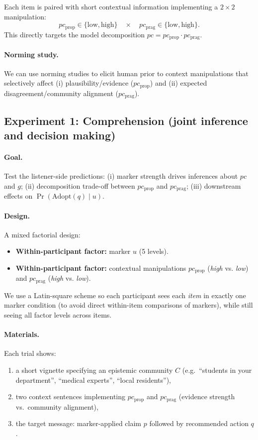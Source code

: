 \documentclass[12pt]{article}
\begin{document}
\noindent Each item is paired with short contextual information implementing a $2 \times 2$ manipulation:
\[
pc_{\text{prop}} \in \{\text{low},\text{high}\}
\quad\times\quad
pc_{\text{prag}} \in \{\text{low},\text{high}\}.
\]
This directly targets the model decomposition $pc = pc_{\text{prop}}\cdot pc_{\text{prag}}$.

\paragraph{Norming study.}
We can use norming studies to elicit human prior to context manipulations that selectively affect (i) plausibility/evidence ($pc_{\text{prop}}$) and (ii) expected disagreement/community alignment ($pc_{\text{prag}}$).

\subsection{Experiment 1: Comprehension (joint inference and decision making)}

\paragraph{Goal.}
Test the listener-side predictions:
(i) marker strength drives inferences about $pc$ and $g$;
(ii) decomposition trade-off between $pc_{\text{prop}}$ and $pc_{\text{prag}}$;
(iii) downstream effects on $\Pr(\mathrm{Adopt}(q)\mid u)$.

\paragraph{Design.}
A mixed factorial design:
\begin{itemize}
\item \textbf{Within-participant factor:} marker $u$ (5 levels).
\item \textbf{Within-participant factor:} contextual manipulations $pc_{\text{prop}}$ (\textit{high} vs. \textit{low}) and $pc_{\text{prag}}$ (\textit{high} vs. \textit{low}).
\end{itemize}
We use a Latin-square scheme so each participant sees each \emph{item} in exactly one marker condition (to avoid direct within-item comparisons of markers), while still seeing all factor levels across items.

\paragraph{Materials.}
Each trial shows:
\begin{enumerate}
\item a short vignette specifying an epistemic community $C$ (e.g.\ ``students in your department'', ``medical experts'', ``local residents''),
\item two context sentences implementing $pc_{\text{prop}}$ and $pc_{\text{prag}}$ (evidence strength vs.\ community alignment),
\item the target message: marker-applied claim $p$ followed by recommended action $q$.
\end{enumerate}
\end{document}
